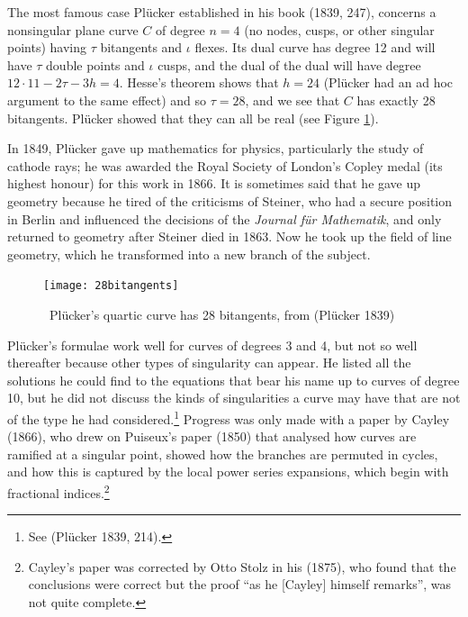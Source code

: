 The most famous case Pl\"ucker established in  his book (1839, 247),  concerns   a nonsingular plane curve $C$ of degree $n=4$  (no nodes, cusps, or other singular points) having $\tau$ bitangents and $\iota$ flexes.   Its dual curve has degree 12 and will have $\tau$ double points and $\iota$ cusps, and the dual of the dual will have degree 
$12\cdot 11 - 2\tau - 3h  = 4.$ 
Hesse's theorem shows that $h = 24$ (Pl\"ucker  had an ad hoc argument to the same effect)  and so $\tau = 28$,  and we  see that $C$ has exactly 28 bitangents. Pl\"ucker showed that they can all be real (see Figure \ref{fig28bitangents}).

In 1849, Pl\"ucker gave up mathematics for physics, particularly the study of cathode rays; he was awarded the Royal Society of London's Copley medal (its highest honour) for this work in 1866. It is sometimes said that he gave up geometry because he tired of the criticisms of Steiner, who had a secure position in Berlin and influenced the decisions of the \emph{Journal f\"ur Mathematik}, and only returned to geometry after Steiner died in 1863. Now he took up  the field of line geometry, which he transformed into a new branch of the subject. 

\bigskip

\begin{center}
    \begin{figure}
   \begin{center}  \texttt{[image: 28bitangents]} 
   \end{center}
     \protect \caption{\, Pl\"ucker's quartic curve has 28 bitangents, from (Pl\"ucker 1839)}
      \label{fig28bitangents}
     \end{figure}
\end{center}
\bigskip

Pl\"ucker's formulae work well for curves of degrees 3 and 4,  but not so well thereafter because other types of singularity can appear.   He listed all the solutions he could find to the equations that bear his name up to curves of degree 10, but he did not discuss the kinds of singularities a curve may have that are not of the type he had considered.\footnote{See (Pl\"ucker 1839, 214).}  Progress was only made with a paper by Cayley (1866), who drew on Puiseux's paper (1850) that analysed  how curves are ramified at a singular point,  showed how the branches are permuted in cycles, and how this is captured by the local power series expansions, which begin with fractional indices.\footnote{Cayley's paper was corrected by Otto Stolz in his (1875), who found that the conclusions were correct but the proof ``as he [Cayley] himself remarks'', was not quite complete.}

